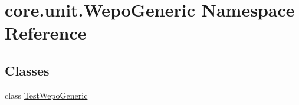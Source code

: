 \hypertarget{namespacecore_1_1unit_1_1WepoGeneric}{\section{core.\-unit.\-Wepo\-Generic Namespace Reference}
\label{namespacecore_1_1unit_1_1WepoGeneric}
}
\subsection*{Classes}
\begin{DoxyCompactItemize}
\item 
class \hyperlink{classcore_1_1unit_1_1WepoGeneric_1_1TestWepoGeneric}{Test\-Wepo\-Generic}
\end{DoxyCompactItemize}
